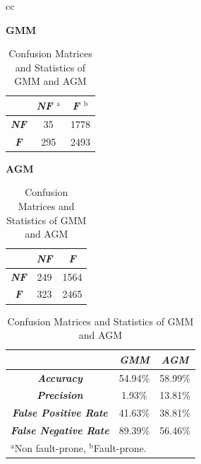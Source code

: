 \begin{table}[h]
\caption{Confusion Matrices and Statistics of GMM and AGM}

\begin{tabular}{cc}
\begin{minipage}{.31\textwidth} 
\textbf{GMM} \\
\begin{tabular}{|c|c|c|}
\hline
 & \multicolumn{1}{|p{1cm}|}{\centering \textbf{\textit{NF $^{\mathrm{a}}$}}} & \multicolumn{1}{|p{1cm}|}{\centering \textbf{\textit{F $^{\mathrm{b}}$}}}\\
\hline
\multicolumn{1}{|p{.4cm}|}{\centering \textbf{\textit{NF}}} & 35 & 1778\\
\multicolumn{1}{|p{.4cm}|}{\centering \textbf{\textit{F}}} & 295 & 2493\\
\hline
\end{tabular}
\end{minipage}

\begin{minipage}{.31\textwidth}    
\textbf{AGM} \\
\begin{tabular}{|c|c|c|}
\hline
 & \multicolumn{1}{|p{1cm}|}{\centering \textbf{\textit{NF}}} & \multicolumn{1}{|p{1cm}|}{\centering \textbf{\textit{F}}}\\
\hline
\multicolumn{1}{|p{.4cm}|}{\centering \textbf{\textit{NF}}} & 249 & 1564\\
\multicolumn{1}{|p{.4cm}|}{\centering \textbf{\textit{F}}} & 323 & 2465\\
\hline
\end{tabular}
\end{minipage}  
\end{tabular}


\begin{tabular}{|c|c|c|}
\hline
 & \multicolumn{1}{|p{1.2cm}|}{\centering \textbf{\textit{GMM}}} & \multicolumn{1}{|p{1.2cm}|}{\centering \textbf{\textit{AGM}}}\\
\hline
\multicolumn{1}{|p{4cm}|}{\centering \textbf{\textit{Accuracy}}}  & 54.94\% & 58.99\%\\
\multicolumn{1}{|p{4cm}|}{\centering \textbf{\textit{Precision}}} & 1.93\% & 13.81\%\\
\multicolumn{1}{|p{4cm}|}{\centering \textbf{\textit{False Positive Rate}}}  & 41.63\% & 38.81\%\\
\multicolumn{1}{|p{4cm}|}{\centering \textbf{\textit{False Negative Rate}}} & 89.39\% & 56.46\%\\
\hline
\multicolumn{3}{l}{$^{\mathrm{a}}$Non fault-prone, $^{\mathrm{b}}$Fault-prone.}
\end{tabular}

\label{tab7}
\end{table}

